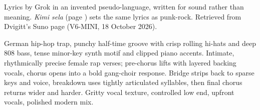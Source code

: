 
\label{sec:sora-keli-muna-taro}
\begin{notes}
Lyrics by Grok in an invented pseudo-language, written for sound rather than meaning. \emph{Kimi sela} (page \pageref{sec:kimi-sela}) sets the same lyrics as punk-rock. Retrieved from Dvigitt's Suno page (V6-MINI, 18 October 2026).
\end{notes}
\begin{style}
German hip-hop trap, punchy half-time groove with crisp rolling hi-hats and deep 808 bass, tense minor-key synth motif and clipped piano accents. Intimate, rhythmically precise female rap verses; pre-chorus lifts with layered backing vocals, chorus opens into a bold gang-choir response. Bridge strips back to sparse keys and voice, breakdown uses tightly articulated syllables, then final chorus returns wider and harder. Gritty vocal texture, controlled low end, upfront vocals, polished modern mix.
\end{style}
